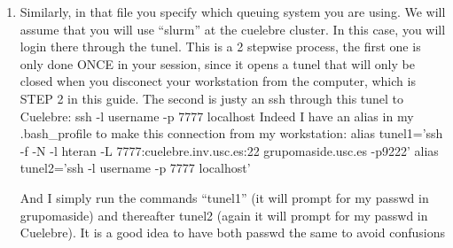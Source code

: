 \documentclass[10pt, oneside, pdftex]{article}
\begin{document}
\begin{enumerate}
\item{Similarly,  in that file you  specify which queuing  system you are
using.  We will  assume  that you  will  use ``slurm''  at the  cuelebre
cluster. In this case, you will login there through the tunel. This is
a 2 stepwise process, the first one is only done ONCE in your session,
since it  opens a tunel  that will only  be closed when  you disconect
your workstation from the computer, which is STEP 2 in this guide. The
second is justy an ssh through this tunel to Cuelebre: ssh -l username
-p 7777 localhost  Indeed I have an alias in  my .bash\_profile to make
this connection from my workstation: alias tunel1='ssh -f -N -l hteran
-L   7777:cuelebre.inv.usc.es:22   grupomaside.usc.es  -p9222'   alias
tunel2='ssh -l username -p 7777 localhost'

And I simply  run the commands ``tunel1'' (it will  prompt for my passwd
in grupomaside)  and thereafter  tunel2 (again it  will prompt  for my
passwd in Cuelebre). It is a good idea to have both passwd the same to
avoid confusions}
\end{enumerate}
\end{document}
